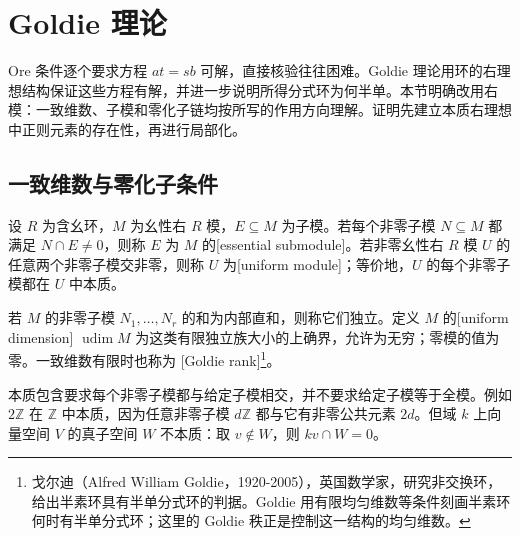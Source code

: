 
\section{Goldie 理论}
\label{b2:sec:1902}

Ore 条件逐个要求方程 \(at=sb\) 可解，直接核验往往困难。Goldie 理论用环的右理想结构保证这些方程有解，并进一步说明所得分式环为何半单。本节明确改用右模：一致维数、子模和零化子链均按所写的作用方向理解。证明先建立本质右理想中正则元素的存在性，再进行局部化。

%
%

\subsection{一致维数与零化子条件}
\label{b2:subsec:1902:01}

\begin{definition}\label{b2:def:essential-uniform-dimension}
	设 \(R\) 为含幺环，\(M\) 为幺性右 \(R\) 模，\(E\subseteq M\) 为子模。若每个非零子模 \(N\subseteq M\) 都满足 \(N\cap E\ne0\)，则称 \(E\) 为 \(M\) 的[essential submodule]。若非零幺性右 \(R\) 模 \(U\) 的任意两个非零子模交非零，则称 \(U\) 为[uniform module]；等价地，\(U\) 的每个非零子模都在 \(U\) 中本质。

	若 \(M\) 的非零子模 \(N_1,\ldots,N_r\) 的和为内部直和，则称它们独立。定义 \(M\) 的[uniform dimension] \(\operatorname{udim}M\) 为这类有限独立族大小的上确界，允许为无穷；零模的值为零。一致维数有限时也称为 [Goldie rank]\footnote{戈尔迪（Alfred William Goldie，1920-2005），英国数学家，研究非交换环，给出半素环具有半单分式环的判据。Goldie 用有限均匀维数等条件刻画半素环何时有半单分式环；这里的 Goldie 秩正是控制这一结构的均匀维数。}。
\end{definition}

本质包含要求每个非零子模都与给定子模相交，并不要求给定子模等于全模。例如 \(2\mathbb Z\) 在 \(\mathbb Z\) 中本质，因为任意非零子模 \(d\mathbb Z\) 都与它有非零公共元素 \(2d\)。但域 \(k\) 上向量空间 \(V\) 的真子空间 \(W\) 不本质：取 \(v\notin W\)，则 \(kv\cap W=0\)。

